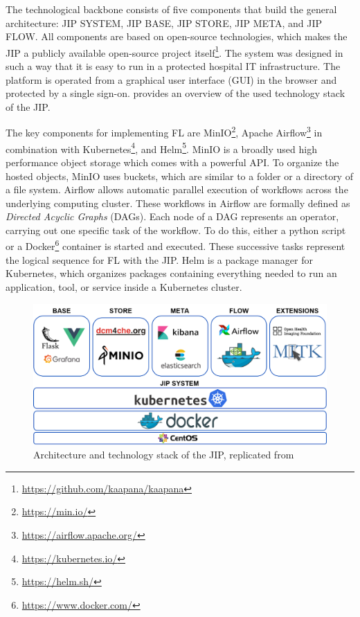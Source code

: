 The technological backbone consists of five components that build the general architecture: JIP SYSTEM, JIP BASE, JIP STORE, JIP META, and JIP FLOW. All components are based on open-source technologies, which makes the JIP a publicly available open-source project itself\footnote{\url{https://github.com/kaapana/kaapana}}. The system was designed in such a way that it is easy to run in a protected hospital IT infrastructure. The platform is operated from a graphical user interface (GUI) in the browser and protected by a single sign-on.  provides an overview of the used technology stack of the JIP.


The key components for implementing FL are MinIO\footnote{\url{https://min.io/}}, Apache Airflow\footnote{\url{https://airflow.apache.org/}} in combination with Kubernetes\footnote{\url{https://kubernetes.io/}}, and Helm\footnote{\url{https://helm.sh/}}.
MinIO is a broadly used high performance object storage which comes with a powerful API. To organize the hosted objects, MinIO uses buckets, which are similar to a folder or a directory of a file system. 
Airflow allows automatic parallel execution of workflows across the underlying computing cluster. These workflows in Airflow are formally defined as \textit{Directed Acyclic Graphs} (DAGs). Each node of a DAG represents an operator, carrying out one specific task of the workflow. To do this, either a python script or a Docker\footnote{\url{https://www.docker.com/}} container is started and executed.
These successive tasks represent the logical sequence for FL with the JIP.
Helm is a package manager for Kubernetes, which organizes packages containing everything needed to run an application, tool, or service inside a Kubernetes cluster.

\begin{figure}[htbp]
    \centerline{\includegraphics[width=1.0\columnwidth]{1_Figures/JIParchitecture.png}}
    \caption[Architecture and technology stack of the JIP]{Architecture and technology stack of the JIP, replicated from \cite{Scherer2020JointAnalytics}}
\label{fig:JIP}
\end{figure}
